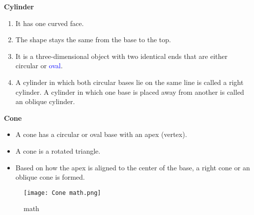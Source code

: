 \documentclass[12pt a4paper]{article}
\begin{document}
\noindent
\LARGE \textbf{Cylinder}
\begin{enumerate}[label=\alph*.]
    \item It has one curved face.
    \item The shape stays the same from the base to the top.
    \item It is a three-dimensional object with two identical ends that are either circular or \textcolor{blue}{oval}.
    \item A cylinder in which both circular bases lie on the same line is called a right cylinder. A cylinder in which one base is placed away from another is called an oblique cylinder.
\end{enumerate}


\newpage

\noindent
\LARGE \textbf{Cone}
\begin{itemize}
    \item[\ding{110}] A cone has a circular or oval base with an apex (vertex).
    \item[\ding{110}] A cone is a rotated triangle.
    \item[\ding{110}] Based on how the apex is aligned to the center of the base, a right cone or an oblique cone is formed.
\end{itemize}


\begin{figure}[h]
    \centering
    \texttt{[image: Cone math.png]}
    \caption{math}
    \label{mathe.png}
\end{figure}

\newpage
\end{document}
